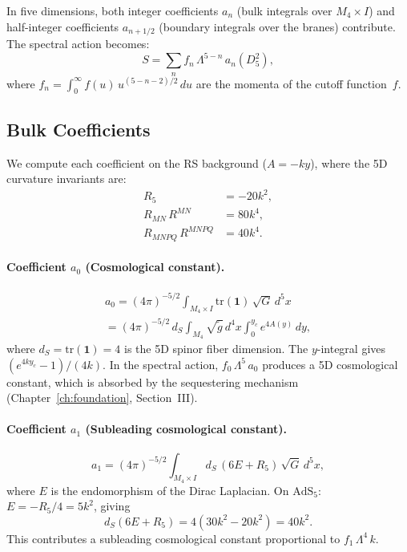 In five dimensions, both integer coefficients $a_n$ (bulk integrals over $M_4 \times I$) and half-integer coefficients $a_{n+1/2}$ (boundary integrals over the branes) contribute. The spectral action becomes:
\begin{equation}
  S = \sum_n f_n\, \Lambda^{5-n}\, a_n(D_5^2),
  \label{eq:4-17}
\end{equation}
where $f_n = \int_0^{\infty} f(u)\, u^{(5-n-2)/2}\, du$ are the momenta of the cutoff function~$f$.


\subsection{Bulk Coefficients}
\label{sec:4-bulk-coefficients}

We compute each coefficient on the RS background ($A = -ky$), where the 5D curvature invariants are:
\begin{subequations}\label{eq:4-18}
\begin{align}
  R_5 &= -20k^2, \label{eq:4-18a}\\
  R_{MN}\, R^{MN} &= 80k^4, \label{eq:4-18b}\\
  R_{MNPQ}\, R^{MNPQ} &= 40k^4. \label{eq:4-18c}
\end{align}
\end{subequations}

\paragraph{Coefficient $a_0$ (Cosmological constant).}
\begin{multline}
  a_0 = (4\pi)^{-5/2} \int_{M_4 \times I} \mathrm{tr}(\mathbf{1})\, \sqrt{G}\, d^5x \\
      = (4\pi)^{-5/2}\, d_S \int_{M_4} \sqrt{\tilde{g}}\, d^4x \int_0^{y_c} e^{4A(y)}\, dy,
  \label{eq:4-19}
\end{multline}
where $d_S = \mathrm{tr}(\mathbf{1}) = 4$ is the 5D spinor fiber dimension. The $y$-integral gives $(e^{4ky_c} - 1)/(4k)$. In the spectral action, $f_0\, \Lambda^5\, a_0$ produces a 5D cosmological constant, which is absorbed by the sequestering mechanism (Chapter~\ref{ch:foundation}, Section~III).

\paragraph{Coefficient $a_1$ (Subleading cosmological constant).}
\begin{equation}
  a_1 = (4\pi)^{-5/2} \int_{M_4 \times I} d_S\, (6E + R_5)\, \sqrt{G}\, d^5x,
  \label{eq:4-20}
\end{equation}
where $E$ is the endomorphism of the Dirac Laplacian. On $\mathrm{AdS}_5$: $E = -R_5/4 = 5k^2$, giving
\begin{equation}
  d_S(6E + R_5) = 4(30k^2 - 20k^2) = 40k^2.
  \label{eq:4-21}
\end{equation}
This contributes a subleading cosmological constant proportional to $f_1\, \Lambda^4\, k$.


